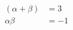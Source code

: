 \documentclass[preview]{standalone}
\begin{document}
\begin{align*}
({\alpha} + {\beta}) & = 3   \\ {\alpha}{\beta} & = -1
\end{align*}
\end{document}
